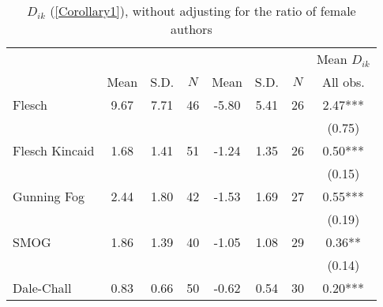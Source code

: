 \begin{table}[H]
    \footnotesize
    \centering
    \begin{threeparttable}
        \caption{\(D_{ik}\) (\autoref{Corollary1}), without adjusting for the ratio of female authors}
        \label{table8_R}
        \begin{tabular}{p{3cm}S[table-format=3.3]@{}S[table-format=3.3]@{}S[table-format=3.2]@{}S[table-format=4.3]@{}S[table-format=3.3]@{}S[table-format=3.1]@{}S@{}}
            \toprule
            &&&{{Mean \(D_{ik}\)}}\\\cmidrule(lr){2-4}\cmidrule(lr){5-7}\cmidrule(lr){8-8}&{{Mean}}&{{S.D.}}&{{\(N\)}}&{{Mean}}&{{S.D.}}&{{\(N\)}}&{{All obs.}}\\
            \midrule
            Flesch                        &        9.67&        7.71&          46&       -5.80&        5.41&          26&        2.47***\\
                                          &            &            &            &            &            &            &      (0.75)   \\
            Flesch Kincaid                &        1.68&        1.41&          51&       -1.24&        1.35&          26&        0.50***\\
                                          &            &            &            &            &            &            &      (0.15)   \\
            Gunning Fog                   &        2.44&        1.80&          42&       -1.53&        1.69&          27&        0.55***\\
                                          &            &            &            &            &            &            &      (0.19)   \\
            SMOG                          &        1.86&        1.39&          40&       -1.05&        1.08&          29&        0.36** \\
                                          &            &            &            &            &            &            &      (0.14)   \\
            Dale-Chall                    &        0.83&        0.66&          50&       -0.62&        0.54&          30&        0.20***\\

\end{tabular}
\end{threeparttable}
\end{table}

